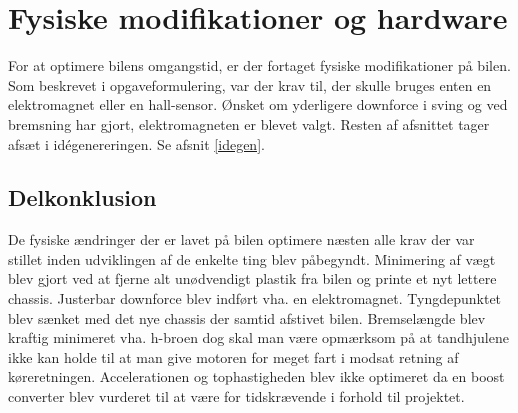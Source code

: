 \newpage
\section{Fysiske modifikationer og hardware}

For at optimere bilens omgangstid, er der fortaget fysiske modifikationer på bilen.
Som beskrevet i opgaveformulering, var der krav til, der skulle bruges enten en elektromagnet eller en hall-sensor.
Ønsket om yderligere downforce i sving og ved bremsning har gjort, elektromagneten er blevet valgt.
Resten af afsnittet tager afsæt i idégenereringen. Se afsnit \ref{idegen}.








\subsection{Delkonklusion}
De fysiske ændringer der er lavet på bilen optimere næsten alle krav der var stillet inden udviklingen af de enkelte ting blev påbegyndt.
Minimering af vægt blev gjort ved at fjerne alt unødvendigt plastik fra bilen og printe et nyt lettere chassis.
Justerbar downforce blev indført vha. en elektromagnet. Tyngdepunktet blev sænket med det nye chassis der samtid afstivet bilen.
Bremselængde blev kraftig minimeret vha. h-broen dog skal man være opmærksom på at tandhjulene ikke kan holde til at man give motoren for meget fart i modsat retning af køreretningen.
Accelerationen og tophastigheden blev ikke optimeret da en boost converter blev vurderet til at være for tidskrævende i forhold til projektet.
